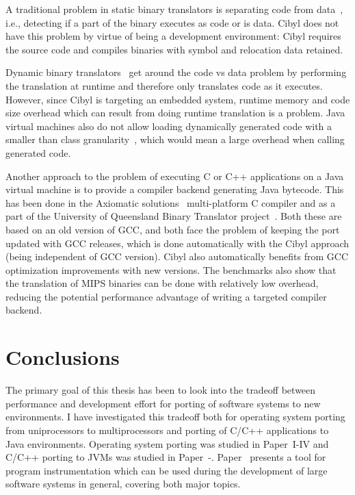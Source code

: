 A traditional problem in static binary translators is separating code from
data~\cite{altman00welcome}, i.e., detecting if a part of the binary executes
as code or is data. Cibyl does not have this problem by virtue of being a
development environment: Cibyl requires the source code and compiles binaries
with symbol and relocation data retained.

Dynamic binary translators~\cite{hookway97fx32, bala00dynamo, buck00dyninst}
get around the code vs data problem by performing the translation at runtime
and therefore only translates code as it executes. However, since Cibyl is
targeting an embedded system, runtime memory and code size overhead which can
result from doing runtime translation is a problem. Java virtual machines also
do not allow loading dynamically generated code with a smaller than class
granularity~\cite{lindholm99jvmspec}, which would mean a large overhead when
calling generated code.

Another approach to the problem of executing C or C++ applications on a Java
virtual machine is to provide a compiler backend generating Java bytecode.
This has been done in the Axiomatic solutions~\cite{axiomsol} multi-platform C
compiler and as a part of the University of Queensland Binary Translator
project~\cite{cifuentes00UAB}. Both these are based on an old version of GCC,
and both face the problem of keeping the port updated with GCC releases, which
is done automatically with the Cibyl approach (being independent of GCC
version). Cibyl also automatically benefits from GCC optimization improvements
with new versions. The benchmarks also show that the translation of MIPS
binaries can be done with relatively low overhead, reducing the potential
performance advantage of writing a targeted compiler backend.


\section{Conclusions}
\label{sec:intro:conclusions}
The primary goal of this thesis has been to look into the tradeoff between
performance and development effort for porting of software systems to new
environments. I have investigated this tradeoff both for operating system
porting from uniprocessors to multiprocessors and porting of C/C++
applications to Java environments. Operating system porting was studied in
Paper~I-IV and C/C++ porting to JVMs was studied in
Paper~-. Paper~
presents a tool for program instrumentation which can be used during the
development of large software systems in general, covering both major topics.

